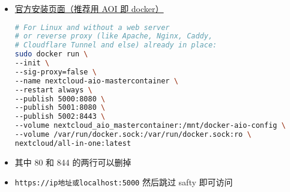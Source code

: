 
\begin{itemize}
\item \href{https://nextcloud.com/install/}{官方安装页面（推荐用 AOI 即 docker）}
\begin{lstlisting}[language=bash]
# For Linux and without a web server
# or reverse proxy (like Apache, Nginx, Caddy,
# Cloudflare Tunnel and else) already in place:
sudo docker run \
--init \
--sig-proxy=false \
--name nextcloud-aio-mastercontainer \
--restart always \
--publish 5000:8080 \
--publish 5001:8080 \
--publish 5002:8443 \
--volume nextcloud_aio_mastercontainer:/mnt/docker-aio-config \
--volume /var/run/docker.sock:/var/run/docker.sock:ro \
nextcloud/all-in-one:latest
\end{lstlisting}
\item 其中 80 和 844 的两行可以删掉
\item \verb`https://ip地址或localhost:5000` 然后跳过 safty 即可访问
\end{itemize}
